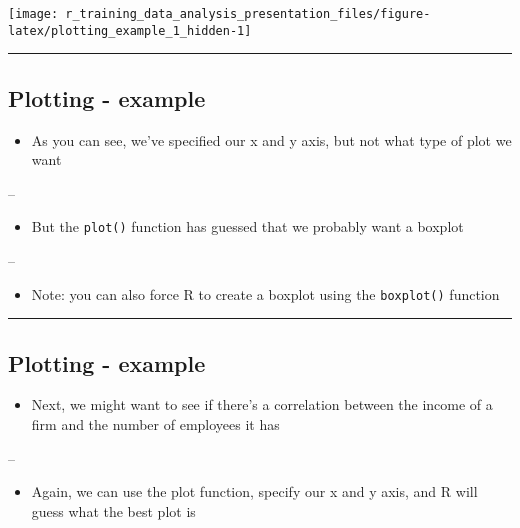 \documentclass[]{article}
\providecommand{\tightlist}{%
  \setlength{\itemsep}{0pt}\setlength{\parskip}{0pt}}
\begin{document}
\begin{center}\texttt{[image: r\_training\_data\_analysis\_presentation\_files/figure-latex/plotting\_example\_1\_hidden-1]} \end{center}

\begin{center}\rule{0.5\linewidth}{\linethickness}\end{center}

\hypertarget{plotting---example-2}{%
\subsection{Plotting - example}\label{plotting---example-2}}

\begin{itemize}
\tightlist
\item
  As you can see, we've specified our x and y axis, but not what type of
  plot we want
\end{itemize}

--

\begin{itemize}
\tightlist
\item
  But the \texttt{plot()} function has guessed that we probably want a
  boxplot
\end{itemize}

--

\begin{itemize}
\tightlist
\item
  Note: you can also force R to create a boxplot using the
  \texttt{boxplot()} function
\end{itemize}

\begin{center}\rule{0.5\linewidth}{\linethickness}\end{center}

\hypertarget{plotting---example-3}{%
\subsection{Plotting - example}\label{plotting---example-3}}

\begin{itemize}
\tightlist
\item
  Next, we might want to see if there's a correlation between the income
  of a firm and the number of employees it has
\end{itemize}

--

\begin{itemize}
\tightlist
\item
  Again, we can use the plot function, specify our x and y axis, and R
  will guess what the best plot is
\end{itemize}
\end{document}
